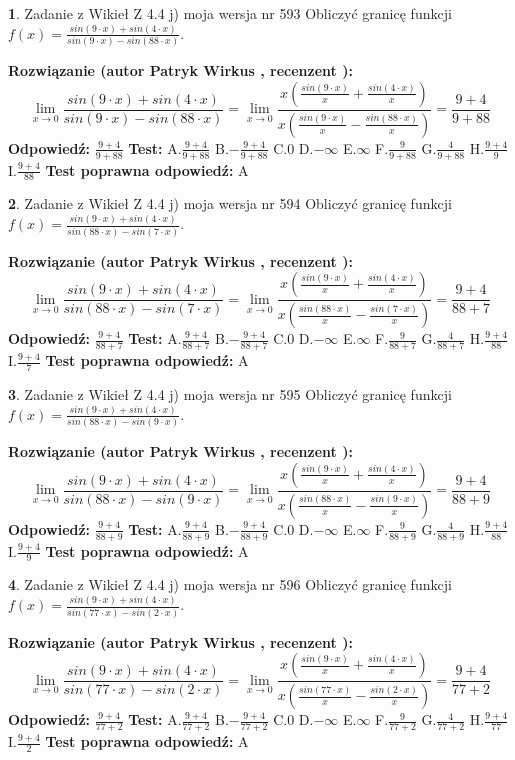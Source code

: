\documentclass[12pt, a4paper]{article}
\theoremstyle{definition} %
\newtheorem{zad}{}
\newcommand{\zadStart}[1]{\begin{zad}#1\newline}
\newcommand{\zadStop}{\end{zad}}
\newcommand{\rozwStart}[2]{\noindent \textbf{Rozwiązanie (autor #1 , recenzent #2): }\newline}
\newcommand{\rozwStop}{\newline}
\newcommand{\odpStart}{\noindent \textbf{Odpowiedź:}\newline}
\newcommand{\odpStop}{\newline}
\newcommand{\testStart}{\noindent \textbf{Test:}\newline}
\newcommand{\testStop}{\newline}
\newcommand{\kluczStart}{\noindent \textbf{Test poprawna odpowiedź:}\newline}
\newcommand{\kluczStop}{\newline}
\begin{document}
\zadStart{Zadanie z Wikieł Z 4.4 j) moja wersja nr 593}
Obliczyć granicę funkcji $f(x)=\frac{sin(9\cdot x) +sin(4\cdot x)}{sin(9\cdot x) -sin(88\cdot x)}$.
\zadStop
\rozwStart{Patryk Wirkus}{}
$$\lim\limits_{x\to 0}\frac{sin(9\cdot x) +sin(4\cdot x)}{sin(9\cdot x) -sin(88\cdot x)}=\lim\limits_{x\to 0}\frac{x(\frac{sin(9\cdot x)}{x}+\frac{sin(4\cdot x)}{x})}{x(\frac{sin(9\cdot x)}{x}-\frac{sin(88\cdot x)}{x})}=\frac{9+4}{9+88}$$
\rozwStop
\odpStart
$\frac{9+4}{9+88}$
\odpStop
\testStart
A.$\frac{9+4}{9+88}$
B.$-\frac{9+4}{9+88}$
C.$0$
D.$-\infty$
E.$\infty$
F.$\frac{9}{9+88}$
G.$\frac{4}{9+88}$
H.$\frac{9+4}{9}$
I.$\frac{9+4}{88}$
\testStop
\kluczStart
A
\kluczStop



\zadStart{Zadanie z Wikieł Z 4.4 j) moja wersja nr 594}
Obliczyć granicę funkcji $f(x)=\frac{sin(9\cdot x) +sin(4\cdot x)}{sin(88\cdot x) -sin(7\cdot x)}$.
\zadStop
\rozwStart{Patryk Wirkus}{}
$$\lim\limits_{x\to 0}\frac{sin(9\cdot x) +sin(4\cdot x)}{sin(88\cdot x) -sin(7\cdot x)}=\lim\limits_{x\to 0}\frac{x(\frac{sin(9\cdot x)}{x}+\frac{sin(4\cdot x)}{x})}{x(\frac{sin(88\cdot x)}{x}-\frac{sin(7\cdot x)}{x})}=\frac{9+4}{88+7}$$
\rozwStop
\odpStart
$\frac{9+4}{88+7}$
\odpStop
\testStart
A.$\frac{9+4}{88+7}$
B.$-\frac{9+4}{88+7}$
C.$0$
D.$-\infty$
E.$\infty$
F.$\frac{9}{88+7}$
G.$\frac{4}{88+7}$
H.$\frac{9+4}{88}$
I.$\frac{9+4}{7}$
\testStop
\kluczStart
A
\kluczStop



\zadStart{Zadanie z Wikieł Z 4.4 j) moja wersja nr 595}
Obliczyć granicę funkcji $f(x)=\frac{sin(9\cdot x) +sin(4\cdot x)}{sin(88\cdot x) -sin(9\cdot x)}$.
\zadStop
\rozwStart{Patryk Wirkus}{}
$$\lim\limits_{x\to 0}\frac{sin(9\cdot x) +sin(4\cdot x)}{sin(88\cdot x) -sin(9\cdot x)}=\lim\limits_{x\to 0}\frac{x(\frac{sin(9\cdot x)}{x}+\frac{sin(4\cdot x)}{x})}{x(\frac{sin(88\cdot x)}{x}-\frac{sin(9\cdot x)}{x})}=\frac{9+4}{88+9}$$
\rozwStop
\odpStart
$\frac{9+4}{88+9}$
\odpStop
\testStart
A.$\frac{9+4}{88+9}$
B.$-\frac{9+4}{88+9}$
C.$0$
D.$-\infty$
E.$\infty$
F.$\frac{9}{88+9}$
G.$\frac{4}{88+9}$
H.$\frac{9+4}{88}$
I.$\frac{9+4}{9}$
\testStop
\kluczStart
A
\kluczStop



\zadStart{Zadanie z Wikieł Z 4.4 j) moja wersja nr 596}
Obliczyć granicę funkcji $f(x)=\frac{sin(9\cdot x) +sin(4\cdot x)}{sin(77\cdot x) -sin(2\cdot x)}$.
\zadStop
\rozwStart{Patryk Wirkus}{}
$$\lim\limits_{x\to 0}\frac{sin(9\cdot x) +sin(4\cdot x)}{sin(77\cdot x) -sin(2\cdot x)}=\lim\limits_{x\to 0}\frac{x(\frac{sin(9\cdot x)}{x}+\frac{sin(4\cdot x)}{x})}{x(\frac{sin(77\cdot x)}{x}-\frac{sin(2\cdot x)}{x})}=\frac{9+4}{77+2}$$
\rozwStop
\odpStart
$\frac{9+4}{77+2}$
\odpStop
\testStart
A.$\frac{9+4}{77+2}$
B.$-\frac{9+4}{77+2}$
C.$0$
D.$-\infty$
E.$\infty$
F.$\frac{9}{77+2}$
G.$\frac{4}{77+2}$
H.$\frac{9+4}{77}$
I.$\frac{9+4}{2}$
\testStop
\kluczStart
A
\kluczStop
\end{document}
